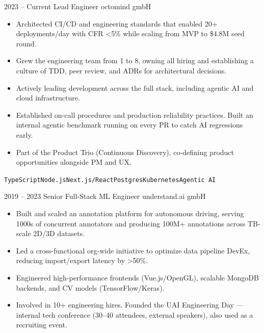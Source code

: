 \documentclass[8pt]{developercv} %
\newcommand{\linebreaksmall}{\vspace{2mm}}
\begin{document}
    \begin{entrylist}
        \entry
        {2023 -- Current}
        {Lead Engineer}
        {octomind gmbH}
        {\vspace{-\baselineskip}\begin{itemize}[leftmargin=*, noitemsep, topsep=0pt, partopsep=0pt, parsep=0pt]
            \item Architected CI/CD and engineering standards that enabled 20+ deployments/day with CFR <5\% while scaling from MVP to \$4.8M seed round.
            \item Grew the engineering team from 1 to 8, owning all hiring and establishing a culture of TDD, peer review, and ADRs for architectural decisions.
            \item Actively leading development across the full stack, including agentic AI and cloud infrastructure.
            \item Established on-call procedures and production reliability practices. Built an internal agentic benchmark running on every PR to catch AI regressions early.
            \item Part of the Product Trio (Continuous Discovery), co-defining product opportunities alongside PM and UX.
        \end{itemize}
        \texttt{TypeScript}\slashsep\texttt{Node.js}\slashsep\texttt{Next.js/React}\slashsep\texttt{Postgres}\slashsep\texttt{Kubernetes}\slashsep\texttt{Agentic AI}} \linebreaksmall
        \entry
        {2019 -- 2023}
        {Senior Full-Stack ML Engineer}
        {understand.ai gmbH}
        {\vspace{-\baselineskip}\begin{itemize}[leftmargin=*, noitemsep, topsep=0pt, partopsep=0pt, parsep=0pt]
            \item Built and scaled an annotation platform for autonomous driving, serving 1000s of concurrent annotators and producing 100M+ annotations across TB-scale 2D/3D datasets.
            \item Led a cross-functional org-wide initiative to optimize data pipeline DevEx, reducing import/export latency by >50\%.
            \item Engineered high-performance frontends (Vue.js/OpenGL), scalable MongoDB backends, and CV models (TensorFlow/Keras).
            \item Involved in 10+ engineering hires. Founded the UAI Engineering Day --- internal tech conference (30--40 attendees, external speakers), also used as a recruiting event.

\end{itemize}}
\end{entrylist}
\end{document}
